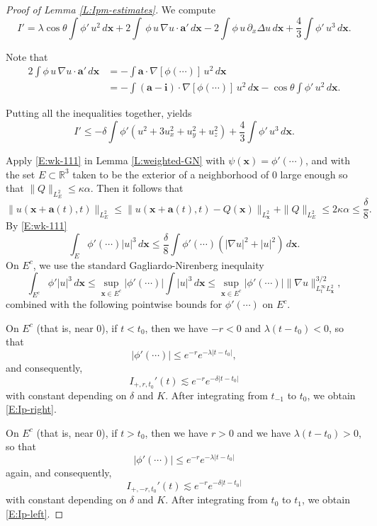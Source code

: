 \documentclass[12pt,letterpaper]{amsart}
\theoremstyle{remark}
\numberwithin{equation}{section}
\numberwithin{theorem}{section}
\numberwithin{table}{section}
\begin{document}
\begin{proof}[Proof of Lemma \ref{L:Ipm-estimates}]
We compute
$$
I' = \lambda \cos \theta \int \phi' \, u^2 \, d\mathbf{x} + 2 \int \, \phi \, u \, \nabla u \cdot \mathbf{a}' \,d \mathbf{x} - 2\int \phi \, u \, \partial_x \Delta u \, d\mathbf{x} +\frac43 \int \phi' \, u^3 \, d \mathbf{x}.
$$

Note that
\begin{align*}
2\int \phi \, u \, \nabla u \cdot \mathbf{a}' \,d \mathbf{x} 
&= - \int \mathbf{a} \cdot \nabla [ \phi(\cdots) ]  \, u^2 \, d\mathbf{x}\\
&= - \int (\mathbf{a}-\mathbf{i}) \cdot \nabla [ \phi(\cdots) ]  \, u^2 \, d\mathbf{x} - \cos\theta \int \phi' \, u^2 \, d \mathbf{x}.
\end{align*}

Putting all the inequalities together, yields
$$
I' \leq - \delta \int \phi'  (u^2 + 3u_x^2+u_y^2+u_z^2)+\frac43 \int \phi' \, u^3 \, d \mathbf{x}.
$$

Apply \eqref{E:wk-111} in Lemma \ref{L:weighted-GN} with $\psi( \mathbf{x}) = \phi'( \cdots)$, 
and with the set $E\subset \mathbb{R}^3$ taken to be the exterior of a neighborhood of $0$ large enough so that $\|Q\|_{L^2_E} \leq \kappa \alpha$.  Then it follows that
$$
\| u( \mathbf{x}+\mathbf{a}(t),t)\|_{L^2_E} \leq \| u( \mathbf{x}+\mathbf{a}(t),t) - Q(\mathbf{x}) \|_{L_{\mathbf{x}}^2} + \|Q\|_{L^2_{E}} \leq 2\kappa \alpha \leq \frac{\delta}{8}.
$$
By \eqref{E:wk-111}
$$
\int_E \phi'(\cdots) |u|^3 \, d \mathbf{x} \leq \frac{\delta}{8}  \int \phi'(\cdots) (|\nabla u|^2 + |u|^2) \,d \mathbf{x}.
$$
On $E^c$, we use the standard Gagliardo-Nirenberg inequlaity
$$
\int_{E^c} \phi' |u|^3 \,d \mathbf{x} \leq \sup_{\mathbf{x} \in E^c} |\phi'(\cdots)| \int |u|^3 \,d \mathbf{x} \leq \sup_{\mathbf{x} \in E^c} |\phi'(\cdots)| \|\nabla u \|_{L_t^\infty L_{\mathbf{x}}^2}^{3/2},
$$
combined with the following pointwise bounds for $\phi'(\cdots)$ on $E^c$. 

On $E^c$ (that is, near $0$), if $t<t_0$, then we have $-r<0$ and $\lambda(t-t_0)<0$, so that 
$$
|\phi'(\cdots)| \leq e^{-r} e^{-\lambda|t-t_0|}, 
$$
and consequently,
$$
I_{+,r,t_0}'(t) \lesssim e^{-r} e^{-\delta |t-t_0|}
$$ 
with constant depending on $\delta$ and $K$.  After integrating from $t_{-1}$ to $t_0$, we obtain \eqref{E:Ip-right}.

On $E^c$ (that is, near $0$), if $t>t_0$, then we have $r>0$ and we have $\lambda(t-t_0)>0$, so that
$$
|\phi'(\cdots)| \leq e^{-r} e^{-\lambda|t-t_0|} 
$$
again, and consequently,
$$
I_{+,-r,t_0} '(t) \lesssim e^{-r} e^{-\delta |t-t_0|} $$ 
with constant depending on $\delta$ and $K$.  After integrating from $t_0$ to $t_1$, 
we obtain \eqref{E:Ip-left}.



\end{proof}
\end{document}
